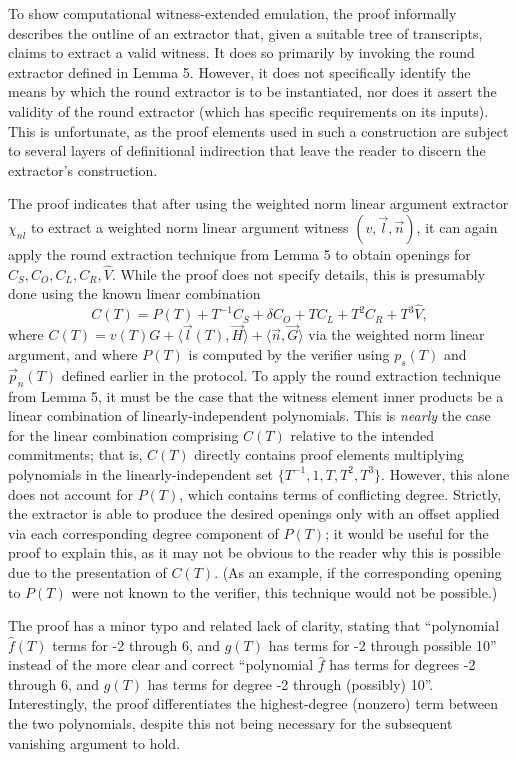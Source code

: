 \documentclass{article}
\begin{document}
To show computational witness-extended emulation, the proof informally describes the outline of an extractor that, given a suitable tree of transcripts, claims to extract a valid witness.
It does so primarily by invoking the round extractor defined in Lemma 5.
However, it does not specifically identify the means by which the round extractor is to be instantiated, nor does it assert the validity of the round extractor (which has specific requirements on its inputs).
This is unfortunate, as the proof elements used in such a construction are subject to several layers of definitional indirection that leave the reader to discern the extractor's construction.

The proof indicates that after using the weighted norm linear argument extractor $\chi_{nl}$ to extract a weighted norm linear argument witness $(v, \vec{l}, \vec{n})$, it can again apply the round extraction technique from Lemma 5 to obtain openings for $C_S, C_O, C_L, C_R, \hat{V}$.
While the proof does not specify details, this is presumably done using the known linear combination
$$C(T) = P(T) + T^{-1} C_S + \delta C_O + T C_L + T^2 C_R + T^3 \hat{V},$$
where $C(T) = v(T) G + \langle \vec{l}(T), \vec{H} \rangle + \langle \vec{n}, \vec{G} \rangle$ via the weighted norm linear argument, and where $P(T)$ is computed by the verifier using $p_s(T)$ and $\vec{p}_n(T)$ defined earlier in the protocol.
To apply the round extraction technique from Lemma 5, it must be the case that the witness element inner products be a linear combination of linearly-independent polynomials.
This is \textit{nearly} the case for the linear combination comprising $C(T)$ relative to the intended commitments; that is, $C(T)$ directly contains proof elements multiplying polynomials in the linearly-independent set $\{ T^{-1}, 1, T, T^2, T^3 \}$.
However, this alone does not account for $P(T)$, which contains terms of conflicting degree.
Strictly, the extractor is able to produce the desired openings only with an offset applied via each corresponding degree component of $P(T)$; it would be useful for the proof to explain this, as it may not be obvious to the reader why this is possible due to the presentation of $C(T)$.
(As an example, if the corresponding opening to $P(T)$ were not known to the verifier, this technique would not be possible.)

The proof has a minor typo and related lack of clarity, stating that ``polynomial $\hat{f}(T)$ terms for -2 through 6, and $g(T)$ has terms for -2 through possible 10'' instead of the more clear and correct ``polynomial $\hat{f}$ has terms for degrees -2 through 6, and $g(T)$ has terms for degree -2 through (possibly) 10''.
Interestingly, the proof differentiates the highest-degree (nonzero) term between the two polynomials, despite this not being necessary for the subsequent vanishing argument to hold.
\end{document}

